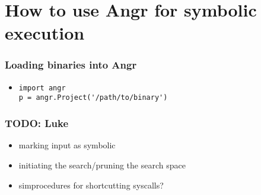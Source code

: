 \documentclass[aspectratio=169]{beamer}
\begin{document}
\section{How to use Angr for symbolic execution}

\begin{frame}[fragile]
\frametitle{Loading binaries into Angr}
\begin{itemize}
\item \begin{Verbatim}[fontsize=\scriptsize, frame=single]
import angr
p = angr.Project('/path/to/binary')
\end{Verbatim}
\end{itemize}
\end{frame}

\begin{frame}[fragile]
\frametitle{TODO: Luke}
\begin{itemize}
\item marking input as symbolic
\item initiating the search/pruning the search space
\item simprocedures for shortcutting syscalls?
\end{itemize}
\end{frame}
\end{document}
